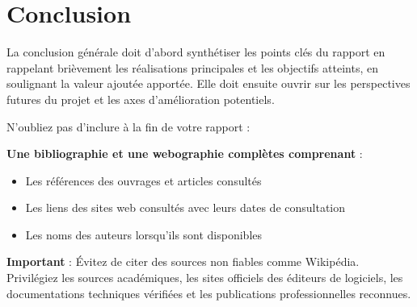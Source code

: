 \chapter*{Conclusion}

La conclusion générale doit d'abord synthétiser les points clés du rapport en rappelant brièvement les réalisations principales et les objectifs atteints, en soulignant la valeur ajoutée apportée. Elle doit ensuite ouvrir sur les perspectives futures du projet et les axes d'amélioration potentiels.



\begin{tcolorbox}[
    enhanced,
    title={\textbf{Attention}},
    colback=white,
    colframe=red!75!black,
    colbacktitle=red!85!black,
    coltitle=white,
    fonttitle=\large\bfseries,
    sharp corners,
    boxrule=1pt,
    left=10pt,
    right=10pt,
    top=10pt,
    bottom=10pt,
    arc=0pt
]
N'oubliez pas d'inclure à la fin de votre rapport :

\textbf{Une bibliographie et une webographie complètes comprenant} :
\begin{itemize}
    \item Les références des ouvrages et articles consultés
    \item Les liens des sites web consultés avec leurs dates de consultation
    \item Les noms des auteurs lorsqu'ils sont disponibles
\end{itemize}

\textbf{Important} : Évitez de citer des sources non fiables comme Wikipédia. Privilégiez les sources académiques, les sites officiels des éditeurs de logiciels, les documentations techniques vérifiées et les publications professionnelles reconnues.
\end{tcolorbox}